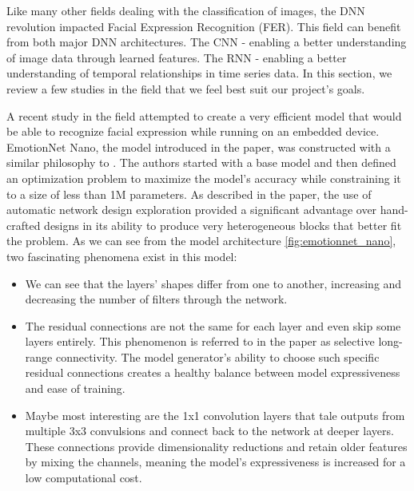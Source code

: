 \documentclass[../main.tex]{subfiles}
\begin{document}
Like many other fields dealing with the classification of images, the DNN revolution impacted Facial Expression Recognition (FER).
This field can benefit from both major DNN architectures. The CNN - enabling a better understanding of image data through learned features.
The RNN - enabling a better understanding of temporal relationships in time series data.
In this section, we review a few studies in the field that we feel best suit our project's goals.
\par

A recent study in the field \cite{emotionnet-nano} attempted to create a very efficient model that would be able
to recognize facial expression while running on an embedded device.  EmotionNet Nano, the model introduced in the paper,
was constructed with a similar philosophy to \cite{effnet}. The authors started with a base model and then defined an
optimization problem to maximize the model's accuracy while constraining it to a size of less than 1M parameters.
As described in the paper, the use of automatic network design exploration provided a significant advantage over hand-crafted
designs in its ability to produce very heterogeneous blocks that better fit the problem.
As we can see from the model architecture \ref{fig:emotionnet_nano}, two fascinating phenomena exist in this model:

\begin{samepage}
\begin{itemize}
    \item We can see that the layers' shapes differ from one to another, increasing and decreasing the number of filters through the network.
    \item The residual connections are not the same for each layer and even skip some layers entirely.
        This phenomenon is referred to in the paper as selective long-range connectivity. The model generator's ability to choose such
        specific residual connections creates a healthy balance between model expressiveness and ease of training.
    \item Maybe most interesting are the 1x1 convolution layers that tale outputs from multiple 3x3 convulsions
        and connect back to the network at deeper layers. These connections provide dimensionality reductions and retain older
        features by mixing the channels, meaning the model's expressiveness is increased for a low computational cost.
\end{itemize}
\end{samepage}
\end{document}
